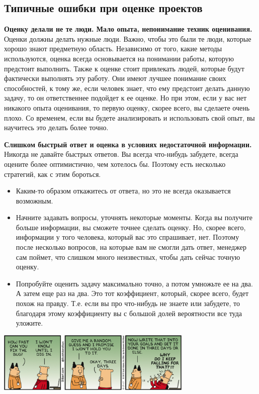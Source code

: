 \documentclass{../../text-style}
\begin{document}
\subsection{Типичные ошибки при оценке проектов}

\textbf{Оценку делали не те люди. Мало опыта, непонимание техник оценивания.} Оценки должны делать нужные люди. Важно, чтобы это были те люди, которые хорошо знают предметную область. Независимо от того, какие методы используются, оценка всегда основывается на понимании работы, которую предстоит выполнить. Также к оценке стоит привлекать людей, которые будут фактически выполнять эту работу. Они имеют лучшее понимание своих способностей, к тому же, если человек знает, что ему предстоит делать данную задачу, то он ответственнее подойдет к ее оценке. Но при этом, если у вас нет никакого опыта оценивания, то первую оценку, скорее всего, вы сделаете очень плохо. Со временем, если вы будете анализировать и использовать свой опыт, вы научитесь это делать более точно.

\textbf{Слишком быстрый ответ и оценка в условиях недостаточной информации.} Никогда не давайте быстрых ответов. Вы всегда что-нибудь забудете, всегда оцените более оптимистично, чем хотелось бы. Поэтому есть несколько стратегий, как с этим бороться.

\begin{itemize}
    \item Каким-то образом откажитесь от ответа, но это не всегда оказывается возможным.
    \item Начните задавать вопросы, уточнять некоторые моменты. Когда вы получите больше информации, вы сможете точнее сделать оценку. Но, скорее всего, информации у того человека, который вас это спрашивает, нет. Поэтому после несколько вопросов, на которые вам не смогли дать ответ, менеджер сам поймет, что слишком много неизвестных, чтобы дать сейчас точную оценку.
    \item Попробуйте оценить задачу максимально точно, а потом умножьте ее на два. А затем еще раз на два. Это тот коэффициент, который, скорее всего, будет похож на правду. Т.е. если вы про что-нибудь не знаете или забудете, то благодаря этому коэффициенту вы с большой долей вероятности все туда уложите.
\end{itemize}

\begin{center}
    \includegraphics[width=0.7\textwidth]{dilbertEstimation.png}
\end{center}
\end{document}
